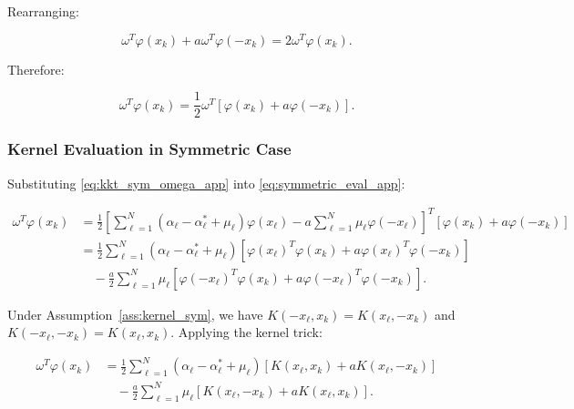\documentclass[mathematics,article,submit,pdftex,moreauthors]{Definitions/mdpi}
\begin{document}
Rearranging:
\begin{linenomath}
\begin{equation}
\omega^T\varphi(x_k) + a\omega^T\varphi(-x_k) = 2\omega^T\varphi(x_k).
\end{equation}
\end{linenomath}

Therefore:
\begin{linenomath}
\begin{equation}\label{eq:symmetric_eval_app}
\omega^T\varphi(x_k) = \frac{1}{2}\omega^T[\varphi(x_k) + a\varphi(-x_k)].
\end{equation}
\end{linenomath}

\subsubsection{Kernel Evaluation in Symmetric Case}

Substituting \eqref{eq:kkt_sym_omega_app} into \eqref{eq:symmetric_eval_app}:
\begin{linenomath}
\begin{equation}
\begin{aligned}
\omega^T\varphi(x_k) 
&= \frac{1}{2}\left[\sum_{\ell=1}^N (\alpha_\ell - \alpha_\ell^* + \mu_\ell)\varphi(x_\ell) - a\sum_{\ell=1}^N \mu_\ell\varphi(-x_\ell)\right]^T[\varphi(x_k) + a\varphi(-x_k)]\\
&= \frac{1}{2}\sum_{\ell=1}^N (\alpha_\ell - \alpha_\ell^* + \mu_\ell)[\varphi(x_\ell)^T\varphi(x_k) + a\varphi(x_\ell)^T\varphi(-x_k)]\\
&\quad - \frac{a}{2}\sum_{\ell=1}^N \mu_\ell[\varphi(-x_\ell)^T\varphi(x_k) + a\varphi(-x_\ell)^T\varphi(-x_k)].
\end{aligned}
\end{equation}
\end{linenomath}

Under Assumption~\ref{ass:kernel_sym}, we have $K(-x_\ell, x_k) = K(x_\ell, -x_k)$ and $K(-x_\ell, -x_k) = K(x_\ell, x_k)$. 
Applying the kernel trick:
\begin{linenomath}
\begin{equation}
\begin{aligned}
\omega^T\varphi(x_k) 
&= \frac{1}{2}\sum_{\ell=1}^N (\alpha_\ell - \alpha_\ell^* + \mu_\ell)[K(x_\ell, x_k) + aK(x_\ell, -x_k)]\\
&\quad - \frac{a}{2}\sum_{\ell=1}^N \mu_\ell[K(x_\ell, -x_k) + aK(x_\ell, x_k)].
\end{aligned}
\end{equation}
\end{linenomath}
\end{document}
